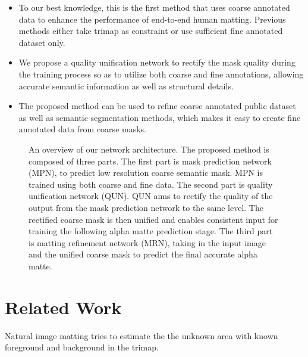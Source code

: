 \documentclass[10pt,twocolumn,letterpaper]{article}
\begin{document}
\begin{itemize}[topsep=0.5pt, itemsep=0.5pt, partopsep=0.5pt]
\item To our best knowledge, this is the first method that uses coarse annotated data to enhance the performance of end-to-end human matting. Previous methods either take trimap as constraint or use sufficient fine annotated dataset only.
\item We propose a quality unification network to rectify the mask quality during the training process so as to utilize both coarse and fine annotations, allowing accurate semantic information as well as structural details.
\item The proposed method can be used to refine coarse annotated public dataset as well as semantic segmentation methods, which makes it easy to create fine annotated data from coarse masks.
\end{itemize}


















\begin{figure*}[ht]
  \centering
  \caption{An overview of our network architecture. The proposed method is composed of three parts. The first part is mask prediction network (MPN), to predict low resolution coarse semantic mask. MPN is trained using both coarse and fine data. The second part is quality unification network (QUN). QUN aims to rectify the quality of the output from the mask prediction network to the same level. The rectified coarse mask is then unified and enables consistent input for training the following alpha matte prediction stage. The third part is matting refinement network (MRN), taking in the input image and the unified coarse mask to predict the final accurate alpha matte.}
  \label{fig: flowchart}
\end{figure*}

\section{Related Work}
 Natural image matting tries to estimate the the unknown area with known foreground and background in the trimap.
\end{document}
